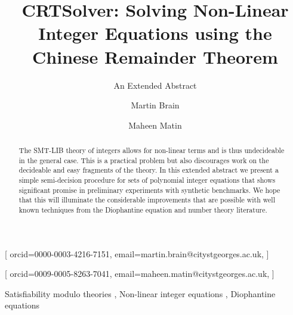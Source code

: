 \documentclass[
]{ceurart}
\begin{document}


\title{CRTSolver: Solving Non-Linear Integer Equations using the Chinese Remainder Theorem}
\subtitle{An Extended Abstract}


\author[1]{Martin Brain}[%
orcid=0000-0003-4216-7151,
email=martin.brain@citystgeorges.ac.uk,
]
\address[1]{City St. George's, University of London,
  Northampton Square, London, EC1V 0HB, United Kingdom}

\author[1]{Maheen Matin}[%
orcid=0009-0005-8263-7041,
email=maheen.matin@citystgeorges.ac.uk,
]


\begin{abstract}
 The SMT-LIB theory of integers allows for non-linear terms and is thus
 undecideable in the general case.
 This is a practical problem but also discourages work on
 the decideable and easy fragments of the theory.
 In this extended abstract we present a simple semi-decision procedure
 for sets of polynomial integer equations that shows significant promise
 in preliminary experiments with synthetic benchmarks.
 We hope that this will illuminate the considerable improvements that
 are possible with well known techniques from the Diophantine equation and
 number theory literature.
\end{abstract}

\begin{keywords}
  Satisfiability modulo theories \sep
  Non-linear integer equations \sep
  Diophantine equations
\end{keywords}

\maketitle
\end{document}
